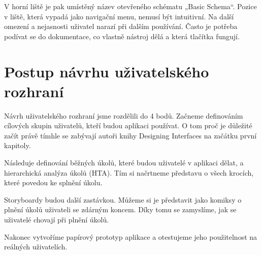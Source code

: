 V horní liště je pak umístěný název otevřeného schématu „Basic Schema“. Pozice v liště, která vypadá jako navigační menu, nemusí být intuitivní. Na další omezení a nejasnosti uživatel narazí při dalším používání. Často je potřeba podívat se do dokumentace, co vlastně nástroj dělá a která tlačítka fungují.

\section{Postup návrhu uživatelského rozhraní}

Návrh uživatelského rozhraní jsme rozdělili do 4 bodů. Začneme definováním cílových skupin uživatelů, kteří budou aplikaci používat. O tom proč je důležité začít právě tímhle se zabývají autoři knihy Designing Interfaces \cite{Designing_ifaces_2nd_edition} na začátku první kapitoly.

Následuje definování běžných úkolů, které budou uživatelé v aplikaci dělat, a hierarchická analýza úkolů (HTA). Tím si načrtneme představu o všech krocích, které povedou ke splnění úkolu.

Storyboardy budou další zastávkou. Můžeme si je představit jako komiksy o plnění úkolů uživateli se zdárným koncem. Díky tomu se zamyslíme, jak se uživatelé chovají při plnění úkolů.

Nakonec vytvoříme papírový prototyp aplikace a otestujeme jeho použitelnost na reálných uživatelích.
